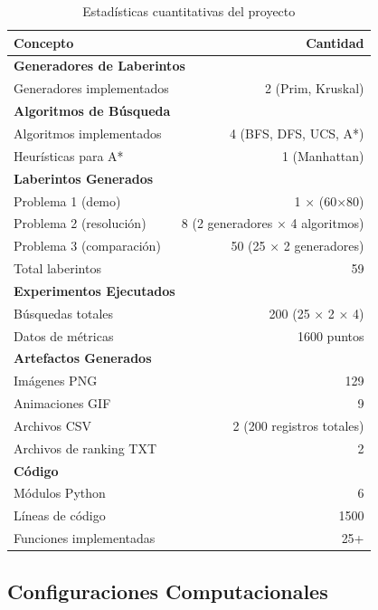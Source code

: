 \documentclass[12pt,a4paper]{article}
\begin{document}
\begin{table}[H]
\centering
\caption{Estadísticas cuantitativas del proyecto}
\begin{tabular}{|l|r|}
\hline
\textbf{Concepto} & \textbf{Cantidad} \\
\hline
\multicolumn{2}{|l|}{\textbf{Generadores de Laberintos}} \\
\hline
Generadores implementados & 2 (Prim, Kruskal) \\
\hline
\multicolumn{2}{|l|}{\textbf{Algoritmos de Búsqueda}} \\
\hline
Algoritmos implementados & 4 (BFS, DFS, UCS, A*) \\
\hline
Heurísticas para A* & 1 (Manhattan) \\
\hline
\multicolumn{2}{|l|}{\textbf{Laberintos Generados}} \\
\hline
Problema 1 (demo) & 1 × (60×80) \\
\hline
Problema 2 (resolución) & 8 (2 generadores × 4 algoritmos) \\
\hline
Problema 3 (comparación) & 50 (25 × 2 generadores) \\
\hline
Total laberintos & 59 \\
\hline
\multicolumn{2}{|l|}{\textbf{Experimentos Ejecutados}} \\
\hline
Búsquedas totales & 200 (25 × 2 × 4) \\
\hline
Datos de métricas & 1600 puntos \\
\hline
\multicolumn{2}{|l|}{\textbf{Artefactos Generados}} \\
\hline
Imágenes PNG & 129 \\
\hline
Animaciones GIF & 9 \\
\hline
Archivos CSV & 2 (200 registros totales) \\
\hline
Archivos de ranking TXT & 2 \\
\hline
\multicolumn{2}{|l|}{\textbf{Código}} \\
\hline
Módulos Python & 6 \\
\hline
Líneas de código & ~1500 \\
\hline
Funciones implementadas & 25+ \\
\hline
\end{tabular}
\end{table}


\subsection{Configuraciones Computacionales}
\end{document}
